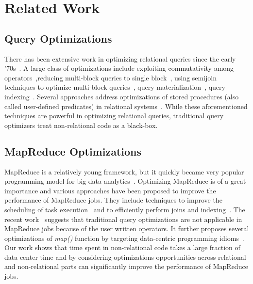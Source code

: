 \section{Related Work}
\subsection{Query Optimizations}
There has been extensive work in optimizing relational queries since the early '70s~\cite{Chaudhuri:1998}. A large class of optimizations include exploiting commutativity among operators~\cite{Chaudhuri:1994,Yan:1995},reducing multi-block queries to single block~\cite{Kim:1982,Muralikrishna:1992}, using semijoin techniques to optimize multi-block queries~\cite{Mumick:1994,Seshadri:1996}, query materialization~\cite{Chaudhuri:1995,Phan:2008}, query indexing~\cite{SELLIS1988175,Bertino:1989,Fang:2008}. Several approaches address optimizations of stored procedures (also called user-defined predicates) in relational systems~\cite{Hellerstein:1993,Chimenti:1989}. While these aforementioned techniques are powerful in optimizing relational queries, traditional query optimizers treat non-relational code as a black-box.

\subsection{MapReduce Optimizations}
MapReduce is a relatively young framework, but it quickly became very popular programming model for big data analytics~\cite{Gates:2009}. Optimizing MapReduce is of a great importance and various approaches have been proposed to improve the performance of MapReduce jobs. They include techniques to improve the scheduling of task execution~\cite{Isard:2009,Zaharia:2008} and to efficiently perform joins and indexing~\cite{Dittrich:2010,Floratou:2011}. The recent work~\cite{Jahani:2011} suggests that traditional query optimizations are not applicable in MapReduce jobs because of the user written operators. It further proposes several optimizations of \emph{map()} function by targeting data-centric programming idioms~\cite{Jahani:2011}. Our work shows that time spent in non-relational code takes a large fraction of data center time and by considering optimizations opportunities across relational and non-relational parts can significantly improve the performance of MapReduce jobs.
